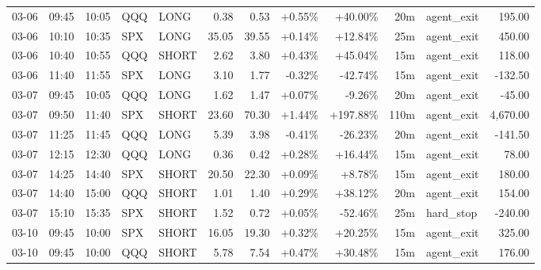 \documentclass[11pt,a4paper]{article}
\begin{document}
\begin{center}
\begin{longtable}{>{\color{txtmain}}l l l l l r r r r r >{\color{txtmain}}l r}
03-06 & 09:45 & 10:05 & QQQ & LONG & 0.38 & 0.53 & \textcolor{wingreen}{+0.55\%} & \textcolor{wingreen}{+40.00\%} & 20m & agent\_exit & \textcolor{wingreen}{195.00} \\
03-06 & 10:10 & 10:35 & SPX & LONG & 35.05 & 39.55 & \textcolor{wingreen}{+0.14\%} & \textcolor{wingreen}{+12.84\%} & 25m & agent\_exit & \textcolor{wingreen}{450.00} \\
03-06 & 10:40 & 10:55 & QQQ & SHORT & 2.62 & 3.80 & \textcolor{wingreen}{+0.43\%} & \textcolor{wingreen}{+45.04\%} & 15m & agent\_exit & \textcolor{wingreen}{118.00} \\
03-06 & 11:40 & 11:55 & SPX & LONG & 3.10 & 1.77 & \textcolor{lossred}{-0.32\%} & \textcolor{lossred}{-42.74\%} & 15m & agent\_exit & \textcolor{lossred}{-132.50} \\
03-07 & 09:45 & 10:05 & QQQ & LONG & 1.62 & 1.47 & \textcolor{wingreen}{+0.07\%} & \textcolor{lossred}{-9.26\%} & 20m & agent\_exit & \textcolor{lossred}{-45.00} \\
03-07 & 09:50 & 11:40 & SPX & SHORT & 23.60 & 70.30 & \textcolor{wingreen}{+1.44\%} & \textcolor{wingreen}{+197.88\%} & 110m & agent\_exit & \textcolor{wingreen}{4,670.00} \\
03-07 & 11:25 & 11:45 & QQQ & LONG & 5.39 & 3.98 & \textcolor{lossred}{-0.41\%} & \textcolor{lossred}{-26.23\%} & 20m & agent\_exit & \textcolor{lossred}{-141.50} \\
03-07 & 12:15 & 12:30 & QQQ & LONG & 0.36 & 0.42 & \textcolor{wingreen}{+0.28\%} & \textcolor{wingreen}{+16.44\%} & 15m & agent\_exit & \textcolor{wingreen}{78.00} \\
03-07 & 14:25 & 14:40 & SPX & SHORT & 20.50 & 22.30 & \textcolor{wingreen}{+0.09\%} & \textcolor{wingreen}{+8.78\%} & 15m & agent\_exit & \textcolor{wingreen}{180.00} \\
03-07 & 14:40 & 15:00 & QQQ & SHORT & 1.01 & 1.40 & \textcolor{wingreen}{+0.29\%} & \textcolor{wingreen}{+38.12\%} & 20m & agent\_exit & \textcolor{wingreen}{154.00} \\
03-07 & 15:10 & 15:35 & SPX & SHORT & 1.52 & 0.72 & \textcolor{wingreen}{+0.05\%} & \textcolor{lossred}{-52.46\%} & 25m & hard\_stop & \textcolor{lossred}{-240.00} \\
03-10 & 09:45 & 10:00 & SPX & SHORT & 16.05 & 19.30 & \textcolor{wingreen}{+0.32\%} & \textcolor{wingreen}{+20.25\%} & 15m & agent\_exit & \textcolor{wingreen}{325.00} \\
03-10 & 09:45 & 10:00 & QQQ & SHORT & 5.78 & 7.54 & \textcolor{wingreen}{+0.47\%} & \textcolor{wingreen}{+30.48\%} & 15m & agent\_exit & \textcolor{wingreen}{176.00} \\

\end{longtable}
\end{center}
\end{document}
